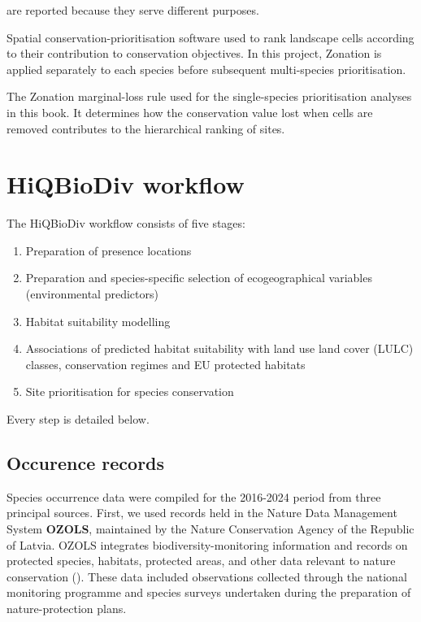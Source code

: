 \documentclass[
  openany]{book}
\begin{document}
\begin{description}
are reported because they serve different purposes.
\item[\textbf{Zonation / Zonation 5}]
Spatial conservation-prioritisation software used to rank landscape cells
according to their contribution to conservation objectives. In this project,
Zonation is applied separately to each species before subsequent multi-species
prioritisation.
\item[\textbf{CAZMAX}]
The Zonation marginal-loss rule used for the single-species prioritisation
analyses in this book. It determines how the conservation value lost when cells
are removed contributes to the hierarchical ranking of sites.
\end{description}

\chapter{HiQBioDiv workflow}\label{workflow}

The HiQBioDiv workflow consists of five stages:

\begin{enumerate}
\def\labelenumi{\arabic{enumi}.}
\item
  Preparation of presence locations
\item
  Preparation and species-specific selection of ecogeographical variables (environmental predictors)
\item
  Habitat suitability modelling
\item
  Associations of predicted habitat suitability with land use land cover (LULC) classes, conservation regimes and EU protected habitats
\item
  Site prioritisation for species conservation
\end{enumerate}

Every step is detailed below.

\section{Occurence records}\label{presences}

Species occurrence data were compiled for the 2016-2024 period from three principal sources. First, we used records held in the Nature Data Management System \textbf{OZOLS}, maintained by the Nature Conservation Agency of the Republic of Latvia. OZOLS integrates biodiversity-monitoring information and records on protected species, habitats, protected areas, and other data relevant to nature conservation (). These data included observations collected through the national monitoring programme and species surveys undertaken during the preparation of nature-protection plans.
\end{document}
